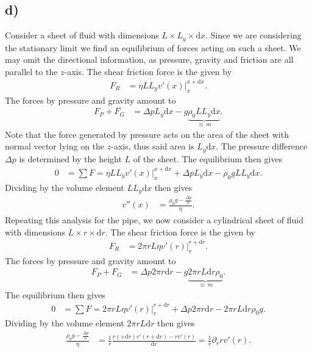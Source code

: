 \documentclass[english, parskip=full]{scrartcl}
\newcommand{\kla}{}
\newcommand{\tecxt}{}
\begin{document}
\subsection*{d)}
Consider a sheet of fluid with dimensions $L\times L_y\times \tecxt\text{d}x$.
Since we are considering the stationary limit we find an equilibrium of forces acting on such a sheet.
We may omit the directional information, as pressure, gravity and friction are all parallel to the $z$-axis.
The shear friction force is the given by
\begin{align}
F_R &= \eta LL_y v'(x) \Big\vert_x^{x+\tecxt\text{d}x}.
\end{align}
The forces by pressure and gravity amount to
\begin{align}
F_P + F_G &= \Delta p L_y\tecxt\text{d}x - g\underbrace{\rho_0 LL_y \tecxt\text{d}x}_{\equiv\, m}.
\end{align}
Note that the force generated by pressure acts on the area of the sheet with normal vector lying on the $z$-axis, thus said area is $L_y\tecxt\text{d}x$.
The pressure difference $\Delta p$ is determined by the height $L$ of the sheet.
The equilibrium then gives
\begin{align}
0 &= \sum F = \eta LL_y v'(x) \Big\vert_x^{x+\tecxt\text{d}x} + \Delta pL_y\tecxt\text{d}x - \rho_0 g  LL_y\tecxt\text{d}x.
\end{align}
Dividing by the volume element $LL_y\tecxt\text{d}x$ then gives
\begin{align}
v''(x) &= \frac{\rho_0 g - \frac{\Delta p}{L}}{\eta} .
\end{align}
Repeating this analysis for the pipe, we now consider a cylindrical sheet of fluid with dimensions $L\times r \times \tecxt\text{d}r$.
The shear friction force is the given by
\begin{align}
F_R &= 2\pi rL \eta  v'(r) \Big\vert_r^{r+\tecxt\text{d}r}.
\end{align}
The forces by pressure and gravity amount to
\begin{align}
F_P + F_G &= \Delta p 2\pi r\tecxt\text{d}r - g\underbrace{2\pi rL \tecxt\text{d}r \rho_0}_{\equiv\, m}.
\end{align}
The equilibrium then gives
\begin{align}
0 &= \sum F = 2\pi rL\eta v'(r) \Big\vert_r^{r+\tecxt\text{d}r} + \Delta p 2\pi r\tecxt\text{d}r - 2\pi rL \tecxt\text{d}r\rho_0 g .
\end{align}
Dividing by the volume element $2\pi rL \tecxt\text{d}r$ then gives
\begin{align}
\frac{\rho_0 g - \frac{\Delta p}{L}}{\eta} &= \frac{1}{r} \frac{r( + \tecxt\text{d}r) v'\kla\left( r + \tecxt\text{d}r \right) - rv'(r)}{\tecxt\text{d}r} = \frac{1}{r}\partial_r rv'(r).
\end{align}
\end{document}
